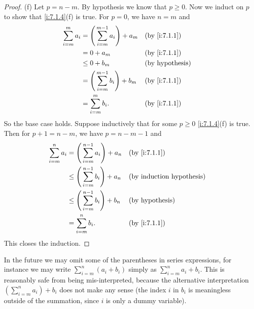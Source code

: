 \begin{proof}{(f)}
  Let \(p = n - m\).
  By hypothesis we know that \(p \geq 0\).
  Now we induct on \(p\) to show that \cref{i:7.1.4}(f) is true.
  For \(p = 0\), we have \(n = m\) and
  \begin{align*}
    \sum_{i = m}^m a_i & = \Bigg(\sum_{i = m}^{m - 1} a_i\Bigg) + a_m &  & \by{i:7.1.1}           \\
                       & = 0 + a_m                                    &  & \by{i:7.1.1}           \\
                       & \leq 0 + b_m                                 &  & \text{(by hypothesis)} \\
                       & = \Bigg(\sum_{i = m}^{m - 1} b_i\Bigg) + b_m &  & \by{i:7.1.1}           \\
                       & = \sum_{i = m}^m b_i.                        &  & \by{i:7.1.1}           \\
  \end{align*}
  So the base case holds.
  Suppose inductively that for some \(p \geq 0\) \cref{i:7.1.4}(f) is true.
  Then for \(p + 1 = n - m\), we have \(p = n - m - 1\) and
  \begin{align*}
    \sum_{i = m}^n a_i & = \Bigg(\sum_{i = m}^{n - 1} a_i\Bigg) + a_n    &  & \by{i:7.1.1}           \\
                       & \leq \Bigg(\sum_{i = m}^{n - 1} b_i\Bigg) + a_n &  & \byIH                  \\
                       & \leq \Bigg(\sum_{i = m}^{n - 1} b_i\Bigg) + b_n &  & \text{(by hypothesis)} \\
                       & = \sum_{i = m}^n b_i.                           &  & \by{i:7.1.1}           \\
  \end{align*}
  This closes the induction.
\end{proof}

\begin{rmk}\label{i:7.1.5}
  In the future we may omit some of the parentheses in series expressions, for instance we may write \(\sum_{i = m}^n (a_i + b_i)\) simply as \(\sum_{i = m}^n a_i + b_i\).
  This is reasonably safe from being mis-interpreted, because the alternative interpretation \((\sum_{i = m}^n a_i) + b_i\) does not make any sense
  (the index \(i\) in \(b_i\) is meaningless outside of the summation, since \(i\) is only a dummy variable).
\end{rmk}

